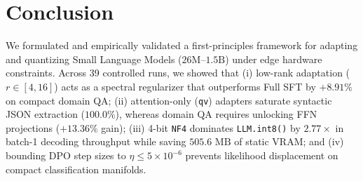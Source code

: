 \documentclass[10pt,a4paper,twocolumn]{article}
\begin{document}
\section{Conclusion}

We formulated and empirically validated a first-principles framework for adapting and quantizing Small Language Models ($26\text{M}$--$1.5\text{B}$) under edge hardware constraints. Across 39 controlled runs, we showed that (i) low-rank adaptation ($r \in [4, 16]$) acts as a spectral regularizer that outperforms Full SFT by $+8.91\%$ on compact domain QA; (ii) attention-only (\texttt{qv}) adapters saturate syntactic JSON extraction ($100.0\%$), whereas domain QA requires unlocking FFN projections ($+13.36\%$ gain); (iii) 4-bit \texttt{NF4} dominates \texttt{LLM.int8()} by $2.77\times$ in batch-1 decoding throughput while saving $505.6\text{ MB}$ of static VRAM; and (iv) bounding DPO step sizes to $\eta \le 5\times 10^{-6}$ prevents likelihood displacement on compact classification manifolds.



\end{document}
